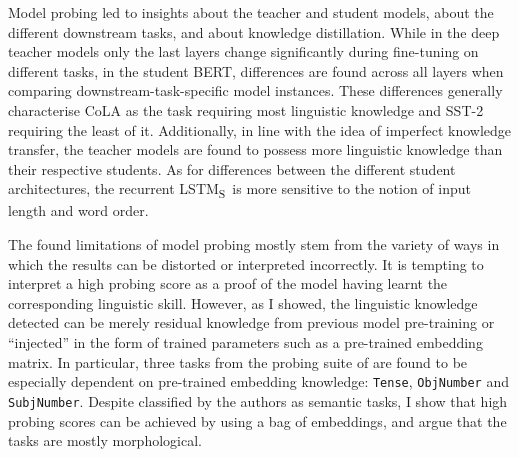 \documentclass[bsc,frontabs,twoside,singlespacing,parskip,deptreport]{infthesis}
\def\LSTMS{LSTM\textsubscript{S}}
\begin{document}
{{    %
    Model probing led to insights about the teacher and student models, about the different downstream tasks, and about knowledge distillation.
    While in the deep teacher models only the last layers change significantly during fine-tuning on different tasks, in the student BERT, differences are found across all layers when comparing downstream-task-specific model instances.
    These differences generally characterise CoLA as the task requiring most linguistic knowledge and SST-2 requiring the least of it.
    Additionally, in line with the idea of imperfect knowledge transfer, the teacher models are found to possess more linguistic knowledge than their respective students.
    As for differences between the different student architectures, the recurrent \LSTMS~is more sensitive to the notion of input length and word order.

    The found limitations of model probing mostly stem from the variety of ways in which the results can be distorted or interpreted incorrectly.
    It is tempting to interpret a high probing score as a proof of the model having learnt the corresponding linguistic skill.
    However, as I showed, the linguistic knowledge detected can be merely residual knowledge from previous model pre-training or ``injected'' in the form of trained parameters such as a pre-trained embedding matrix.
    In particular, three tasks from the probing suite of \citet{Conneau_2018} are found to be especially dependent on pre-trained embedding knowledge: \verb|Tense|, \verb|ObjNumber| and \verb|SubjNumber|. Despite classified by the authors as semantic tasks, I show that high probing scores can be achieved by using a bag of embeddings, and argue that the tasks are mostly morphological.

}}
\end{document}
